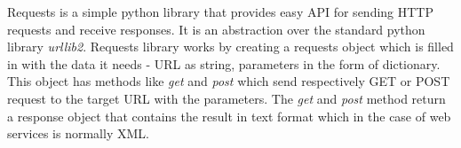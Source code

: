 Requests is a simple python library that provides easy API for sending HTTP requests and receive responses. It is an
abstraction over the standard python library \textit{urllib2}. Requests library works by creating a requests object
which is filled in with the data it needs - URL as string, parameters in the form of dictionary. This object has methods like \textit{get} and \textit{post}
which send respectively GET or POST request to the target URL with the parameters. The \textit{get} and \textit{post} method return a
response object that contains the result in text format which in the case of web services is normally XML.